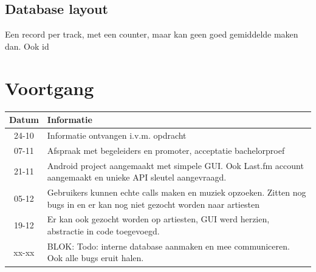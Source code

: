 \documentclass[11pt,a4paper]{article}
\begin{document}
	\subsection{Database layout}
	Een record per track, met een counter, maar kan geen goed gemiddelde maken dan. Ook id
\section{Voortgang}
	\begin{tabular}{| c | p{\linewidth} | }
	\hline
	Datum & Informatie \\ \hline \hline 
	24-10 & Informatie ontvangen i.v.m. opdracht \\ \hline
	07-11 & Afspraak met begeleiders en promoter, acceptatie bachelorproef \\ \hline
	21-11 & Android project aangemaakt met simpele GUI. Ook Last.fm account aangemaakt en unieke API sleutel aangevraagd. \\ \hline
	05-12 & Gebruikers kunnen echte calls maken en muziek opzoeken. Zitten nog bugs in en er kan nog niet gezocht worden naar artiesten \\ \hline
	19-12 & Er kan ook gezocht worden op artiesten, GUI werd herzien, abstractie in code toegevoegd. \\ \hline
	xx-xx & BLOK: Todo: interne database aanmaken en mee communiceren. Ook alle bugs eruit halen. \\ \hline
	
	\end{tabular}
\end{document}
